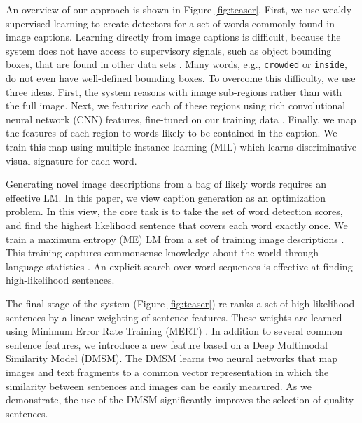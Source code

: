 \documentclass[10pt,twocolumn,letterpaper]{article}
\begin{document}
An overview of our approach is shown in Figure \ref{fig:teaser}. First, we use weakly-supervised learning to create detectors for a set of words commonly found in image captions. Learning directly from image captions is difficult, because the system does not have access to supervisory signals, such as object bounding boxes, that are found in other data sets \cite{PASCAL, imagenet_cvpr09}. Many words, e.g., \texttt{crowded} or \texttt{inside}, do not even have well-defined bounding boxes. To overcome this difficulty, we use three ideas. First, the system reasons with image sub-regions rather than with the full image. Next, we featurize each of these regions using rich convolutional neural network (CNN) features, fine-tuned on our training data \cite{krizhevskyNIPS12,simonyan14very}. Finally, we map the features of each region to  words likely to be contained in the caption. We train this map using multiple instance learning (MIL) \cite{maron98,zhangNIPS05} which learns discriminative visual signature for each word.

Generating novel image descriptions from a bag of likely words requires an effective LM. In this paper, we view caption generation as an optimization problem. In this view, the core task is to take the set of word detection scores, and find the highest likelihood sentence that covers each word exactly once. We train a maximum entropy (ME) LM from a set of training image descriptions \cite{Berger1996,ratnaparkhi2002trainable}. This training captures commonsense knowledge about the world through language statistics \cite{NELL}. An explicit search over word sequences is effective at finding high-likelihood sentences.

The final stage of the system (Figure \ref{fig:teaser}) re-ranks a set of high-likelihood sentences by a linear weighting of sentence features. These weights are learned using Minimum Error Rate Training (MERT) \cite{Och2003}. In addition to several common sentence features, we introduce a new feature based on a Deep Multimodal Similarity Model (DMSM). The DMSM learns two neural networks that map images and text fragments to a common vector representation in which the similarity between sentences and images can be easily measured. As we demonstrate, the use of the DMSM significantly improves the selection of quality sentences.
\end{document}
